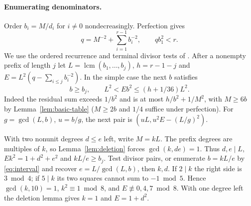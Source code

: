 \documentclass[11pt]{amsart}
\numberwithin{equation}{section}
\theoremstyle{definition}
\theoremstyle{plain}
\DeclareMathOperator{\lcm}{lcm}
\begin{document}
\paragraph{Enumerating denominators.}
Order $b_i=M/d_i$ for $i\ne0$ nondecreasingly. Perfection gives
\begin{equation}\label{eq:recip}
 q=M^{-2}+\sum_{i=1}^{r-1}b_i^{-2},\qquad qb_1^2<r .
\end{equation}
We use the ordered recurrence and terminal divisor tests of
\cite[\S18.2, Propositions~18.2--18.3]{BDPcore}. After a nonempty prefix of length $j$ let $L=\lcm(b_1,\ldots,b_j)$,
$h=r-1-j$ and $E=L^2(q-\sum_{i\le j}b_i^{-2})$. In the simple
case the next $b$ satisfies
\begin{equation}\label{eq:interval}
 b\ge b_j,\qquad L^2<Eb^2\le(h+1/36)L^2.
\end{equation}
Indeed the residual sum exceeds $1/b^2$ and is at most $h/b^2+1/M^2$,
with $M\ge6b$ by Lemma~\ref{lem:basic-table} ($M\ge2b$ and $1/4$
suffice under perfection). For $g=\gcd(L,b)$, $u=b/g$, the next
pair is $(uL,u^2E-(L/g)^2)$.

With two nonunit degrees $d\le e$ left, write $M=kL$. The prefix
degrees are multiples of $k$, so Lemma~\ref{lem:deletion} forces
$\gcd(k,de)=1$. Thus $d,e\mid L$, $Ek^2=1+d^2+e^2$ and $kL/e\ge b_j$.
Test divisor pairs, or enumerate $b=kL/e$ by \eqref{eq:interval} and
recover $e=L/\gcd(L,b)$, then $k,d$. If $2\mid k$ the right side
is $3\bmod4$; if $5\mid k$ its two squares cannot sum to $-1\bmod5$.
Hence $\gcd(k,10)=1$, $k^2\equiv1\bmod8$, and
$E\not\equiv0,4,7\bmod8$. With one degree left the deletion lemma
gives $k=1$ and $E=1+d^2$.
\end{document}
